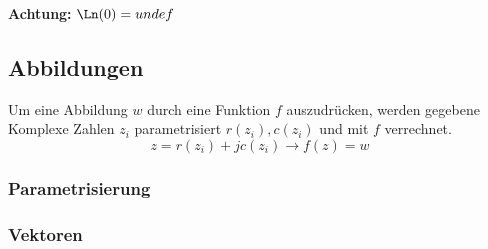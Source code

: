 \noindent\textbf{Achtung:} $\Ln(0) = undef$


\subsection{Abbildungen}
Um eine Abbildung $w$ durch eine Funktion $f$ auszudrücken, werden gegebene Komplexe Zahlen $z_i$ parametrisiert $r(z_i), c(z_i)$ und mit $f$ verrechnet.
\[z = r(z_i) + jc(z_i) \rightarrow f(z) = w \]



\subsubsection{Parametrisierung}
\subsubsection{Vektoren}
